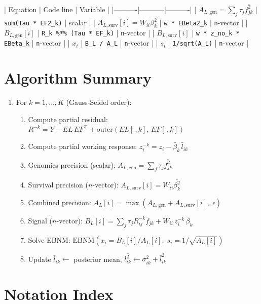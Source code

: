 \documentclass[11pt]{article}
\newcommand{\lbar}[2]{\bar{l}_{#1#2}}
\newcommand{\fbar}[2]{\bar{f}_{#1#2}}
\newcommand{\betabar}[1]{\bar{\beta}_{#1}}
\newcommand{\fsec}[2]{\overline{f^2_{#1#2}}}
\newcommand{\betasec}[1]{\overline{\beta^2_{#1}}}
\newcommand{\Rk}[0]{R^{-k}}
\newcommand{\zk}[0]{z^{-k}}
\begin{document}
| Equation | Code line | Variable |
|----------|-----------|----------|
| $A_{L,\text{gen}} = \sum_j\tau_j\fsec{j}{k}$ | \texttt{sum(Tau * EF2\_k)} | scalar |
| $A_{L,\text{surv}}[i] = W_{ii}\betasec{k}$ | \texttt{w * EBeta2\_k} | \texttt{n}-vector |
| $B_{L,\text{gen}}[i]$ | \texttt{R\_k \%*\% (Tau * EF\_k)} | \texttt{n}-vector |
| $B_{L,\text{surv}}[i]$ | \texttt{w * z\_no\_k * EBeta\_k} | \texttt{n}-vector |
| $x_i$ | \texttt{B\_L / A\_L} | \texttt{n}-vector |
| $s_i$ | \texttt{1/sqrt(A\_L)} | \texttt{n}-vector |

\section{Algorithm Summary}\label{sec:algorithm}

\begin{enumerate}
  \item For $k = 1, \ldots, K$ (Gauss-Seidel order):
  \begin{enumerate}
    \item Compute partial residual:
      $\Rk = Y - EL\,EF^\top + \mathrm{outer}(EL[\,,k],\,EF[\,,k])$
    \item Compute partial working response:
      $\zk_i = z_i - \betabar{k}\,\lbar{i}{k}$
    \item Genomics precision (scalar):
      $A_{L,\text{gen}} = \sum_j \tau_j\fsec{j}{k}$
    \item Survival precision ($n$-vector):
      $A_{L,\text{surv}}[i] = W_{ii}\betasec{k}$
    \item Combined precision:
      $A_L[i] = \max(A_{L,\text{gen}} + A_{L,\text{surv}}[i],\;\epsilon)$
    \item Signal ($n$-vector):
      $B_L[i] = \sum_j\tau_j\Rk_{ij}\fbar{j}{k} + W_{ii}\,\zk_i\,\betabar{k}$
    \item Solve EBNM:
      $\mathrm{EBNM}(x_i = B_L[i]/A_L[i],\; s_i = 1/\sqrt{A_L[i]})$
    \item Update $\bar{l}_{ik} \leftarrow$ posterior mean,\quad
      $\overline{l^2_{ik}} \leftarrow \sigma_{ik}^2 + \bar{l}_{ik}^2$
  \end{enumerate}
\end{enumerate}

\appendix
\section{Notation Index}
\end{document}
